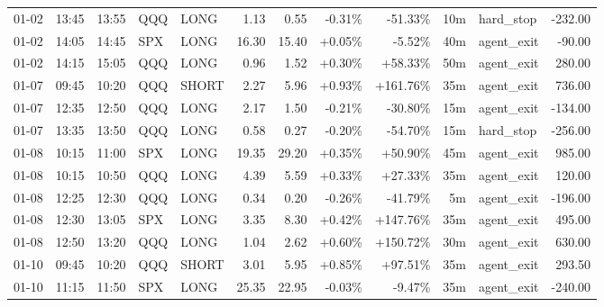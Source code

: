 \documentclass[11pt,a4paper,twoside]{article}
\begin{document}
\begin{center}
\begin{longtable}{>{\color{txtmain}}l l l l l r r r r r >{\color{txtmain}}l r}
01-02 & 13:45 & 13:55 & QQQ & LONG & 1.13 & 0.55 & \textcolor{lossred}{-0.31\%} & \textcolor{lossred}{-51.33\%} & 10m & hard\_stop & \textcolor{lossred}{-232.00} \\
01-02 & 14:05 & 14:45 & SPX & LONG & 16.30 & 15.40 & \textcolor{wingreen}{+0.05\%} & \textcolor{lossred}{-5.52\%} & 40m & agent\_exit & \textcolor{lossred}{-90.00} \\
01-02 & 14:15 & 15:05 & QQQ & LONG & 0.96 & 1.52 & \textcolor{wingreen}{+0.30\%} & \textcolor{wingreen}{+58.33\%} & 50m & agent\_exit & \textcolor{wingreen}{280.00} \\
01-07 & 09:45 & 10:20 & QQQ & SHORT & 2.27 & 5.96 & \textcolor{wingreen}{+0.93\%} & \textcolor{wingreen}{+161.76\%} & 35m & agent\_exit & \textcolor{wingreen}{736.00} \\
01-07 & 12:35 & 12:50 & QQQ & LONG & 2.17 & 1.50 & \textcolor{lossred}{-0.21\%} & \textcolor{lossred}{-30.80\%} & 15m & agent\_exit & \textcolor{lossred}{-134.00} \\
01-07 & 13:35 & 13:50 & QQQ & LONG & 0.58 & 0.27 & \textcolor{lossred}{-0.20\%} & \textcolor{lossred}{-54.70\%} & 15m & hard\_stop & \textcolor{lossred}{-256.00} \\
01-08 & 10:15 & 11:00 & SPX & LONG & 19.35 & 29.20 & \textcolor{wingreen}{+0.35\%} & \textcolor{wingreen}{+50.90\%} & 45m & agent\_exit & \textcolor{wingreen}{985.00} \\
01-08 & 10:15 & 10:50 & QQQ & LONG & 4.39 & 5.59 & \textcolor{wingreen}{+0.33\%} & \textcolor{wingreen}{+27.33\%} & 35m & agent\_exit & \textcolor{wingreen}{120.00} \\
01-08 & 12:25 & 12:30 & QQQ & LONG & 0.34 & 0.20 & \textcolor{lossred}{-0.26\%} & \textcolor{lossred}{-41.79\%} & 5m & agent\_exit & \textcolor{lossred}{-196.00} \\
01-08 & 12:30 & 13:05 & SPX & LONG & 3.35 & 8.30 & \textcolor{wingreen}{+0.42\%} & \textcolor{wingreen}{+147.76\%} & 35m & agent\_exit & \textcolor{wingreen}{495.00} \\
01-08 & 12:50 & 13:20 & QQQ & LONG & 1.04 & 2.62 & \textcolor{wingreen}{+0.60\%} & \textcolor{wingreen}{+150.72\%} & 30m & agent\_exit & \textcolor{wingreen}{630.00} \\
01-10 & 09:45 & 10:20 & QQQ & SHORT & 3.01 & 5.95 & \textcolor{wingreen}{+0.85\%} & \textcolor{wingreen}{+97.51\%} & 35m & agent\_exit & \textcolor{wingreen}{293.50} \\
01-10 & 11:15 & 11:50 & SPX & LONG & 25.35 & 22.95 & \textcolor{lossred}{-0.03\%} & \textcolor{lossred}{-9.47\%} & 35m & agent\_exit & \textcolor{lossred}{-240.00} \\

\end{longtable}
\end{center}
\end{document}
